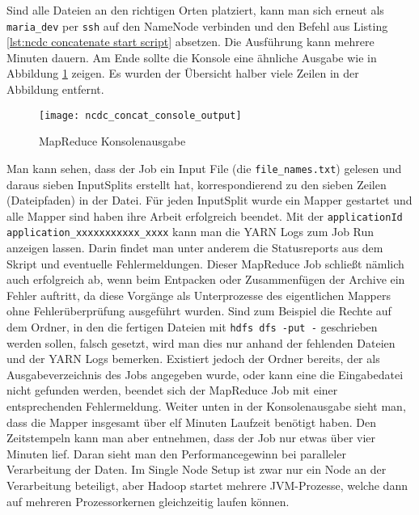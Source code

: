 
\pagebreak
Sind alle Dateien an den richtigen Orten platziert, kann man sich erneut als \verb|maria_dev| per \verb|ssh| auf den NameNode verbinden und den Befehl aus Listing \ref{lst:ncdc concatenate start script} absetzen. Die Ausführung kann mehrere Minuten dauern. Am Ende sollte die Konsole eine ähnliche Ausgabe wie in Abbildung \ref{fig:ncdc concat console output} zeigen. Es wurden der Übersicht halber viele Zeilen in der Abbildung entfernt. 

\begin{figure}[ht]
    \centering
    \texttt{[image: ncdc\_concat\_console\_output]}
    \caption[MapReduce Konsolenausgabe]{MapReduce Konsolenausgabe}
    \label{fig:ncdc concat console output}
\end{figure}

Man kann sehen, dass der Job ein Input File (die \verb|file_names.txt|) gelesen und daraus sieben InputSplits erstellt hat, korrespondierend zu den sieben Zeilen (Dateipfaden) in der Datei. Für jeden InputSplit wurde ein Mapper gestartet und alle Mapper sind haben ihre Arbeit erfolgreich beendet. Mit der \verb|applicationId| \verb|application_xxxxxxxxxxx_xxxx| kann man die YARN Logs zum Job Run anzeigen lassen. Darin findet man unter anderem die Statusreports aus dem Skript und eventuelle Fehlermeldungen. Dieser MapReduce Job schließt nämlich auch erfolgreich ab, wenn beim Entpacken oder Zusammenfügen der Archive ein Fehler auftritt, da diese Vorgänge als Unterprozesse des eigentlichen Mappers ohne Fehlerüberprüfung ausgeführt wurden. Sind zum Beispiel die Rechte auf dem Ordner, in den die fertigen Dateien mit \verb|hdfs dfs -put -| geschrieben werden sollen, falsch gesetzt, wird man dies nur anhand der fehlenden Dateien und der YARN Logs bemerken. Existiert jedoch der Ordner bereits, der als Ausgabeverzeichnis des Jobs angegeben wurde, oder kann eine die Eingabedatei nicht gefunden werden, beendet sich der MapReduce Job mit einer entsprechenden Fehlermeldung. Weiter unten in der Konsolenausgabe sieht man, dass die Mapper insgesamt über elf Minuten Laufzeit benötigt haben. Den Zeitstempeln kann man aber entnehmen, dass der Job nur etwas über vier Minuten lief. Daran sieht man den Performancegewinn bei paralleler Verarbeitung der Daten. Im Single Node Setup ist zwar nur ein Node an der Verarbeitung beteiligt, aber Hadoop startet mehrere JVM-Prozesse, welche dann auf mehreren Prozessorkernen gleichzeitig laufen können.

